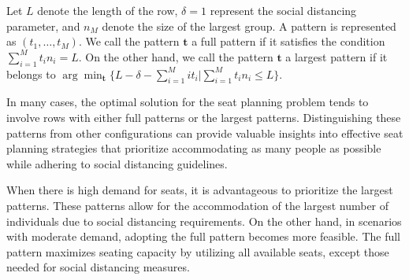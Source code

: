 \begin{definition}
Let $L$ denote the length of the row, $\delta=1$ represent the social distancing parameter, and $n_M$ denote the size of the largest group. A pattern is represented as $(t_1, \ldots, t_M)$.
We call the pattern $\bm{t}$ a full pattern if it satisfies the condition $\sum_{i=1}^{M} t_i n_i = L$. On the other hand, we call the pattern $\bm{t}$ a largest pattern if it belongs to $\arg\min_{\bm{t}} \{L - \delta - \sum_{i =1}^{M} i t_i|\sum_{i=1}^{M} t_i n_i \leq L\}$.




\end{definition}

In many cases, the optimal solution for the seat planning problem tends to involve rows with either full patterns or the largest patterns. Distinguishing these patterns from other configurations can provide valuable insights into effective seat planning strategies that prioritize accommodating as many people as possible while adhering to social distancing guidelines.

When there is high demand for seats, it is advantageous to prioritize the largest patterns. These patterns allow for the accommodation of the largest number of individuals due to social distancing requirements. On the other hand, in scenarios with moderate demand, adopting the full pattern becomes more feasible. The full pattern maximizes seating capacity by utilizing all available seats, except those needed for social distancing measures.

